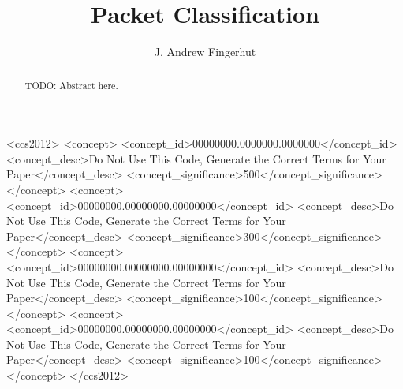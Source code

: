 \documentclass[acmsmall]{acmart}
\newcommand{\todo}[1]{}
\renewcommand{\todo}[1]{{\color{red} TODO: {#1}}}
\begin{document}
\title{Packet Classification}

\author{J. Andrew Fingerhut}


\renewcommand{\shortauthors}{Trovato and Tobin, et al.}

\begin{abstract}
\todo{Abstract here.}
\end{abstract}

\begin{CCSXML}
<ccs2012>
 <concept>
  <concept_id>00000000.0000000.0000000</concept_id>
  <concept_desc>Do Not Use This Code, Generate the Correct Terms for Your Paper</concept_desc>
  <concept_significance>500</concept_significance>
 </concept>
 <concept>
  <concept_id>00000000.00000000.00000000</concept_id>
  <concept_desc>Do Not Use This Code, Generate the Correct Terms for Your Paper</concept_desc>
  <concept_significance>300</concept_significance>
 </concept>
 <concept>
  <concept_id>00000000.00000000.00000000</concept_id>
  <concept_desc>Do Not Use This Code, Generate the Correct Terms for Your Paper</concept_desc>
  <concept_significance>100</concept_significance>
 </concept>
 <concept>
  <concept_id>00000000.00000000.00000000</concept_id>
  <concept_desc>Do Not Use This Code, Generate the Correct Terms for Your Paper</concept_desc>
  <concept_significance>100</concept_significance>
 </concept>
</ccs2012>
\end{CCSXML}

\end{document}
